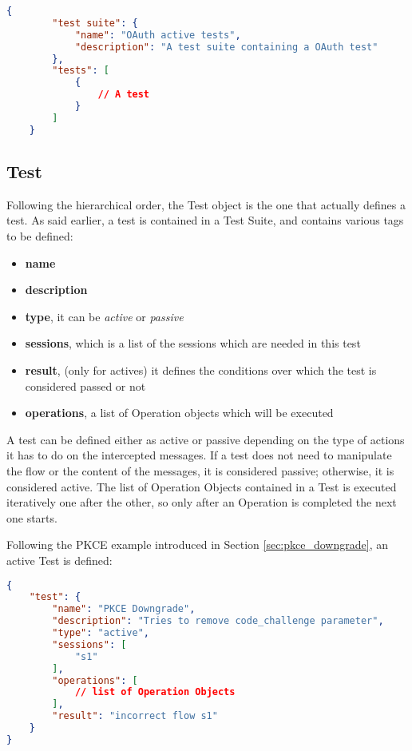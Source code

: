 \begin{lstlisting}[language=json, caption=Test Suite definition, label={lst:test_suite_definition}]
    {
        "test suite": {
            "name": "OAuth active tests",
            "description": "A test suite containing a OAuth test"
        },
        "tests": [
            {
                // A test
            }
        ]
    }
\end{lstlisting}

\subsection{Test}
Following the hierarchical order, the Test object is the one that actually defines a test. As said earlier, a test is contained in a Test Suite, and contains various tags to be defined:
\begin{itemize}
    \item \textbf{name}
    \item \textbf{description}
    \item \textbf{type}, it can be \textit{active} or \textit{passive}
    \item \textbf{sessions}, which is a list of the sessions which are needed in this test
    \item \textbf{result}, (only for actives) it defines the conditions over which the test is considered passed or not
    \item \textbf{operations}, a list of Operation objects which will be executed
\end{itemize}
A test can be defined either as active or passive depending on the type of actions it has to do on the intercepted messages. If a test does not need to manipulate the flow or the content of the messages, it is considered passive; otherwise, it is considered active.
The list of Operation Objects contained in a Test is executed iteratively one after the other, so only after an Operation is completed the next one starts.

Following the \gls{PKCE} example introduced in Section \ref{sec:pkce_downgrade}, an active Test is defined:

\begin{lstlisting}[language=json, caption=Active test definition, label={lst:active_test_definition}]
{
    "test": {
        "name": "PKCE Downgrade",
        "description": "Tries to remove code_challenge parameter",
        "type": "active",
        "sessions": [
            "s1"
        ],
        "operations": [
            // list of Operation Objects
        ],
        "result": "incorrect flow s1"
    }
}    
\end{lstlisting}

